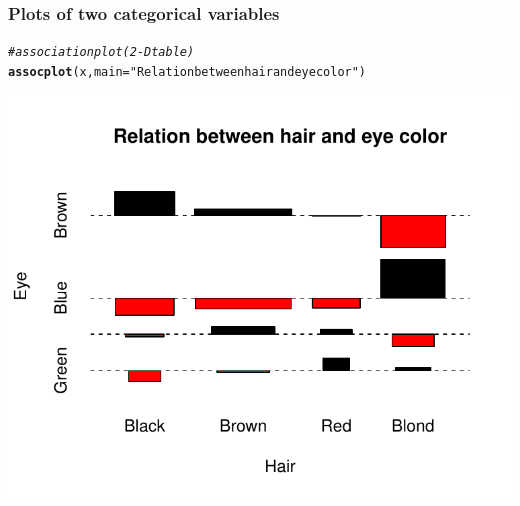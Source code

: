 \documentclass[12pt]{beamer}\usepackage[]{graphicx}\usepackage[]{color}
\makeatletter
\newcommand{\hlstr}[1]{\textcolor[rgb]{0.192,0.494,0.8}{#1}}%
\newcommand{\hlcom}[1]{\textcolor[rgb]{0.678,0.584,0.686}{\textit{#1}}}%
\newcommand{\hlstd}[1]{\textcolor[rgb]{0.345,0.345,0.345}{#1}}%
\newcommand{\hlkwc}[1]{\textcolor[rgb]{0.333,0.667,0.333}{#1}}%
\newcommand{\hlkwd}[1]{\textcolor[rgb]{0.737,0.353,0.396}{\textbf{#1}}}%
\newenvironment{kframe}{%
 \def\at@end@of@kframe{}%
 \ifinner\ifhmode%
  \def\at@end@of@kframe{\end{minipage}}%
  \begin{minipage}{\columnwidth}%
 \fi\fi%
 \def\FrameCommand##1{\hskip\@totalleftmargin \hskip-\fboxsep
 \colorbox{shadecolor}{##1}\hskip-\fboxsep
     \hskip-\linewidth \hskip-\@totalleftmargin \hskip\columnwidth}%
 \MakeFramed {\advance\hsize-\width
   \@totalleftmargin\z@ \linewidth\hsize
   \@setminipage}}%
 {\par\unskip\endMakeFramed%
 \at@end@of@kframe}
\newenvironment{knitrout}{}{} %
\makeatother
\begin{document}
\begin{frame}[fragile]
\frametitle{Plots of two categorical variables}
\begin{knitrout}\footnotesize
{}\color{fgcolor}\begin{kframe}
\begin{alltt}
\hlcom{# association plot (2-D table)}
\hlkwd{assocplot}\hlstd{(x,} \hlkwc{main} \hlstd{=} \hlstr{"Relation between hair and eye color"}\hlstd{)}
\end{alltt}
\end{kframe}

{\centering \includegraphics[width=.7\linewidth,height=.6\linewidth]{figure/unnamed-chunk-20-1} 

}



\end{knitrout}
\end{frame}


\begin{frame}
\begin{center}
\Huge{}
\end{center}
\end{frame}

\end{document}
